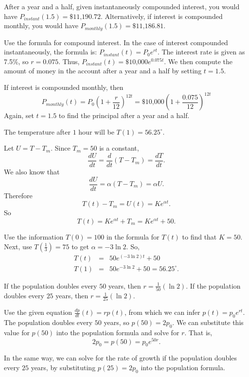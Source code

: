 \documentclass{ximera}
\begin{document}
\ans After a year and a half, given instantaneously compounded
interest, you would have
$P_{instant}(1.5) = \mbox{\$}11\mbox{,}190.72$.
Alternatively, if interest is compounded monthly, you would have
$P_{monthly}(1.5) = \mbox{\$}11\mbox{,}186.81$.

\soln Use the formula for compound interest.  In the case of interest
compounded instantaneously, the formula is:
$P_{instant}(t) = P_0e^{rt}$.  The interest rate is given as 7.5\%, so
$r = 0.075$.  Thus,
$P_{instant}(t) = \mbox{\$}10\mbox{,}000e^{0.075t}$.
We then compute the amount of money in the account after a year
and a half by setting $t = 1.5$.

\para If interest is compounded monthly, then
\[
P_{monthly}(t) = P_0\left(1 + \frac{r}{12}\right)^{12t} =
\mbox{\$}10\mbox{,}000\left(1 + \frac{0.075}{12}\right)^{12t}
\]
Again, set $t = 1.5$ to find the principal after a year and a half.

\ans The temperature after $1$ hour will be $T(1) = 56.25^{\circ}$.

\soln Let $U = T - T_m$.  Since $T_m = 50$ is a constant,
\[
\frac{dU}{dt} = \frac{d}{dt}(T - T_m) = \frac{dT}{dt}.
\]
We also know that
\[
\frac{dU}{dt} = \alpha (T - T_m) = \alpha U. \]
Therefore \[ T(t) - T_m = U(t) = Ke^{\alpha t}. \]
So \[ T(t) = Ke^{\alpha t} + T_m = Ke^{\alpha t} + 50. \]

Use the information $T(0) = 100$ in the formula for $T(t)$ to find that
$K = 50$.  Next, use $T(\frac{1}{3}) = 75$ to get $\alpha = -3\ln{2}$. So,
\[
\begin{array}{rcl}
T(t) & = & 50e^{(-3\ln{2})t} + 50 \\
T(1) & = & 50e^{-3\ln{2}} + 50 = 56.25^{\circ}.\end{array}
\]

\ans If the population doubles every $50$ years, then
$r = \frac{1}{50}(\ln 2)$.  If the population doubles every $25$
years, then $r = \frac{1}{25}(\ln 2)$.

\soln Use the given equation $\frac{dp}{dt}(t) = rp(t)$,
from which we can infer $p(t) = p_0e^{rt}$.
The population doubles every $50$ years, so $p(50) = 2p_0$.  We
can substitute this value for $p(50)$ into the population formula
and solve for $r$.  That is,
\[
2p_0 = p(50) = p_0e^{50r}.
\]

In the same way, we can solve for the rate of growth if the population
doubles every $25$ years, by substituting $p(25) = 2p_0$ into the
population formula.
\end{document}
